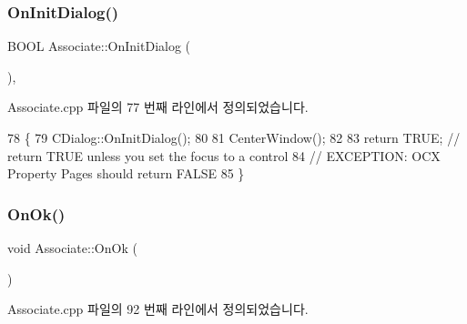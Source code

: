 \subsubsection{\texorpdfstring{On\+Init\+Dialog()}{OnInitDialog()}}
{\footnotesize\ttfamily B\+O\+OL Associate\+::\+On\+Init\+Dialog (\begin{DoxyParamCaption}{ }\end{DoxyParamCaption})\hspace{0.3cm}{\ttfamily [protected]}, {\ttfamily [virtual]}}



Associate.\+cpp 파일의 77 번째 라인에서 정의되었습니다.


\begin{DoxyCode}
78 \{
79   CDialog::OnInitDialog();
80   
81   CenterWindow();
82   
83   \textcolor{keywordflow}{return} TRUE;  \textcolor{comment}{// return TRUE unless you set the focus to a control}
84                 \textcolor{comment}{// EXCEPTION: OCX Property Pages should return FALSE}
85 \}
\end{DoxyCode}
\mbox{\label{class_associate_abb81ded9b91053ed12804ee8674ae860}} 
\subsubsection{\texorpdfstring{On\+Ok()}{OnOk()}}
{\footnotesize\ttfamily void Associate\+::\+On\+Ok (\begin{DoxyParamCaption}{ }\end{DoxyParamCaption})\hspace{0.3cm}{\ttfamily [protected]}}



Associate.\+cpp 파일의 92 번째 라인에서 정의되었습니다.


